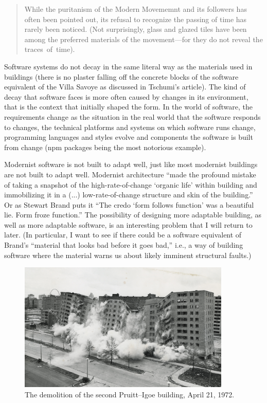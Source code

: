 \begin{quote}
While the puritanism of the Modern Movememnt and its followers has often been pointed out,
its refusal to recognize the passing of time has rarely been noticed. (Not surprisingly,
glass and glazed tiles have been among the preferred materials of the movement---for
they do not reveal the traces~of~time).
\end{quote}

Software systems do not decay in the same literal way as the materials used in buildings
(there is no plaster falling off the concrete blocks of the software equivalent of the
Villa Savoye as discussed in Tschumi's article). The kind of decay that software faces is more
often caused by changes in its environment, that is the context that initially shaped the form.
In the world of software, the requirements change as the situation in the real world that the
software responds to changes, the technical platforms and systems on which software runs change,
programming languages and styles evolve and components the software is built from change
(npm packages being the most notorious example).

Modernist software is not built to adapt well, just like most modernist buildings are not
built to adapt well. Modernist architecture ``made the profound mistake of taking a
snapshot of the high-rate-of-change `organic life' within building and immobilizing it
in a (...) low-rate-of-change structure and skin of the building.''
Or as Stewart Brand puts it ``The credo `form follows function' was a beautiful lie.
Form froze function.'' The possibility of designing more adaptable building,
as well as more adaptable software, is an interesting problem that I will return to later.
(In particular, I want to see if there could be a software equivalent of Brand's ``material
that looks bad before it goes bad,'' i.e., a way of building software where the material
warns us about likely imminent structural faults.)

\begin{figure}
  \centering
  \includegraphics[width=0.9\textwidth]{fig/pruitt-igoe.jpg}
  \caption{The demolition of the second Pruitt–Igoe building, April 21, 1972.}
  \label{fig:pruitt}
\end{figure}

